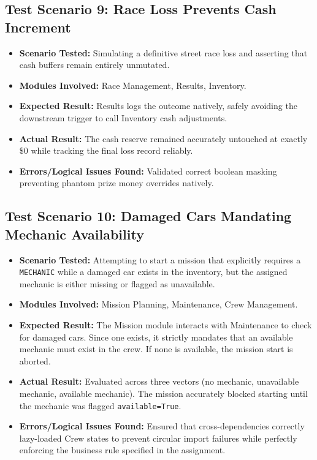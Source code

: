 \documentclass[12pt,a4paper]{article}
\begin{document}
\subsection{Test Scenario 9: Race Loss Prevents Cash Increment}
\begin{itemize}
    \item \textbf{Scenario Tested:} Simulating a definitive street race loss and asserting that cash buffers remain entirely unmutated.
    \item \textbf{Modules Involved:} Race Management, Results, Inventory.
    \item \textbf{Expected Result:} Results logs the outcome natively, safely avoiding the downstream trigger to call Inventory cash adjustments.
    \item \textbf{Actual Result:} The cash reserve remained accurately untouched at exactly $\$0$ while tracking the final loss record reliably.
    \item \textbf{Errors/Logical Issues Found:} Validated correct boolean masking preventing phantom prize money overrides natively.
\end{itemize}

\subsection{Test Scenario 10: Damaged Cars Mandating Mechanic Availability}
\begin{itemize}
    \item \textbf{Scenario Tested:} Attempting to start a mission that explicitly requires a \texttt{MECHANIC} while a damaged car exists in the inventory, but the assigned mechanic is either missing or flagged as unavailable.
    \item \textbf{Modules Involved:} Mission Planning, Maintenance, Crew Management.
    \item \textbf{Expected Result:} The Mission module interacts with Maintenance to check for damaged cars. Since one exists, it strictly mandates that an available mechanic must exist in the crew. If none is available, the mission start is aborted.
    \item \textbf{Actual Result:} Evaluated across three vectors (no mechanic, unavailable mechanic, available mechanic). The mission accurately blocked starting until the mechanic was flagged \texttt{available=True}.
    \item \textbf{Errors/Logical Issues Found:} Ensured that cross-dependencies correctly lazy-loaded Crew states to prevent circular import failures while perfectly enforcing the business rule specified in the assignment.
\end{itemize}
\end{document}
